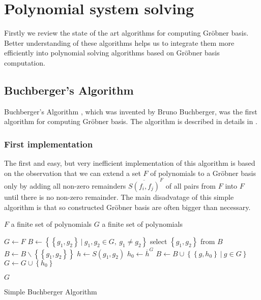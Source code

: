 \chapter{Polynomial system solving}
Firstly we review the state of the art algorithms for computing Gr\"obner basis. Better understanding of these algorithms helps us to integrate them more efficiently into polynomial solving algorithms based on Gr\"obner basis computation.

\section{Buchberger's Algorithm}
Buchberger's Algorithm \cite{Buchberger65}, which was invented by Bruno Buchberger, was the first algorithm for computing Gr\"obner basis. The algorithm is described in details in \cite{Becker93, Cox-Little-Shea97}.

\subsection{First implementation}
The first and easy, but very inefficient implementation of this algorithm is based on the observation that we can extend a set $F$ of polynomials to a Gr\"obner basis only by adding all non-zero remainders $\overline{S(f_i, f_j)}^F$ of all pairs from $F$ into $F$ until there is no non-zero remainder. The main disadvatage of this simple algorithm is that so constructed Gr\"obner basis are often bigger than necessary.

\begin{algorithm}[ht]
  \begin{algorithmic}[1]
    \Require
      \Statex $F$ a finite set of polynomials
    \Ensure
      \Statex $G$ a finite set of polynomials
      \Statex

    \State $G \gets F$
    \State $B \gets \left\{\left\{g_1, g_2\right\}\ |\ g_1, g_2 \in G,\ g_1 \neq g_2\right\}$
      \State select $\left\{g_1, g_2\right\}$ from $B$
      \State $B \gets B\backslash\left\{\left\{g_1, g_2\right\}\right\}$
      \State $h \gets S(g_1, g_2)$
      \State $h_0 \gets \overline{h}^G$
        \State $B \gets B \cup \left\{\left\{g, h_0\right\}\ |\ g\in G\right\}$
        \State $G \gets G \cup \left\{h_0\right\}$
      \EndIf
    \EndWhile

    \State \Return $G$

  \end{algorithmic}
  \caption{Simple Buchberger Algorithm}
\end{algorithm}

